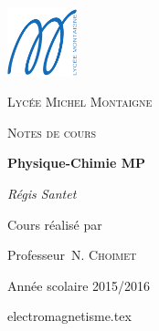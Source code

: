 \documentclass[12pt]{book}
\theoremstyle{definition}
\theoremstyle{remark}
\begin{document}
\begin{titlepage}
    \centering
    \includegraphics[width=0.15\textwidth]{img/logo_lycee_michel_montaigne.png}\par\vspace{1cm}
    {\scshape Lycée Michel Montaigne \par}
    \vspace{1cm}
    {\scshape\Large Notes de cours\par}
    \vspace{1.5cm}
    {\huge\bfseries Physique-Chimie MP\par}
    \vspace{2cm}
    {\Large\itshape Régis Santet\par}
    \vfill
    Cours réalisé par\par
    Professeur~N. \textsc{Choimet}

    \vfill

    {\large Année scolaire 2015/2016\par}
\end{titlepage}

\dominitoc %
\tableofcontents


{electromagnetisme.tex}

\end{document}
